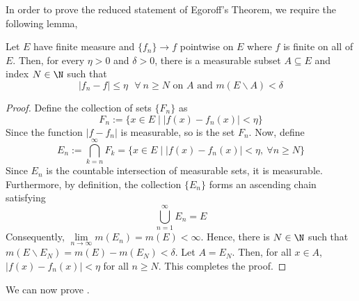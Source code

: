 In order to prove the reduced statement of Egoroff's Theorem, we require the following lemma,

\begin{lemma}
    Let $E$ have finite measure and $\{f_n\}\to f$ pointwise on $E$ where $f$ is finite on all of $E$. Then, for every $\eta > 0$ and $\delta > 0$, there is a measurable subset $A\subseteq E$ and index $N\in\N$ such that 
    \begin{equation*}
        |f_n - f|\le\eta\text{ $\forall~n\ge N$ on $A$ and }m(E\backslash A) < \delta
    \end{equation*}
\end{lemma}
\begin{proof}
    Define the collection of sets $\{F_n\}$ as 
    \begin{equation*}
        F_n := \{x\in E\mid |f(x) - f_n(x)| < \eta\}
    \end{equation*}
    Since the function $|f - f_n|$ is measurable, so is the set $F_n$. Now, define 
    \begin{equation*}
        E_n := \bigcap_{k = n}^\infty F_k = \{x\in E\mid |f(x) - f_n(x)| < \eta,~\forall n\ge N\}
    \end{equation*}
    Since $E_n$ is the countable intersection of measurable sets, it is measurable. Furthermore, by definition, the collection $\{E_n\}$ forms an ascending chain satisfying 
    \begin{equation*}
        \bigcup_{n = 1}^\infty E_n = E
    \end{equation*}
    Consequently, $\lim\limits_{n\to\infty} m(E_n) = m(E) < \infty$. Hence, there is $N\in\N$ such that $m(E\backslash E_N) = m(E) - m(E_N) < \delta$. Let $A = E_N$. Then, for all $x\in A$, $|f(x) - f_n(x)| < \eta$ for all $n\ge N$. This completes the proof.
\end{proof}

We can now prove .


